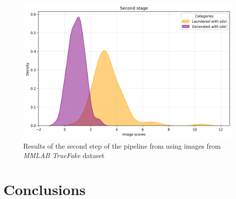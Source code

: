 \documentclass[conference]{IEEEtran} %
\begin{document}
    \begin{figure}[h]
        \centering
        \includegraphics[width=0.95\linewidth]{Img/second_stage.png}
        \caption{Results of the second step of the pipeline from \cite{mandelli2024synthetic} using images from \textit{MMLAB TrueFake} dataset}
        \label{fig:second_stage}
    \end{figure}

\section{Conclusions}

\end{document}
